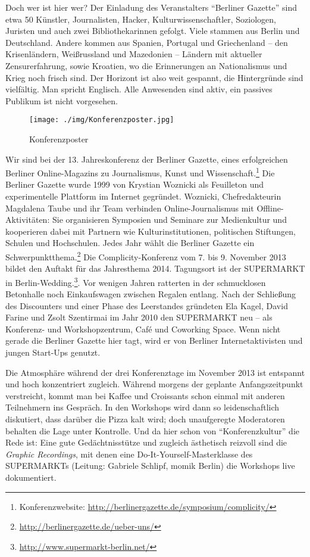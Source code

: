 \documentclass[a4paper,
fontsize=11pt,
oneside,
numbers=noperiodatend,
parskip=half-,
bibliography=totoc,
final
]{scrartcl}
\begin{document}
Doch wer ist hier wer? Der Einladung des Veranstalters \enquote{Berliner
Gazette} sind etwa 50 Künstler, Journalisten, Hacker,
Kulturwissenschaftler, Soziologen, Juristen und auch zwei
Bibliothekarinnen gefolgt. Viele stammen aus Berlin und Deutschland.
Andere kommen aus Spanien, Portugal und Griechenland -- den
Krisenländern, Weißrussland und Mazedonien -- Ländern mit aktueller
Zensurerfahrung, sowie Kroatien, wo die Erinnerungen an Nationalismus
und Krieg noch frisch sind. Der Horizont ist also weit gespannt, die
Hintergründe sind vielfältig. Man spricht Englisch. Alle Anwesenden sind
aktiv, ein passives Publikum ist nicht vorgesehen.

\begin{figure}[htbp]
\centering
\texttt{[image: ./img/Konferenzposter.jpg]}
\caption{Konferenzposter}
\end{figure}

Wir sind bei der 13. Jahreskonferenz der Berliner Gazette, eines
erfolgreichen Berliner Online-Magazins zu Journalismus, Kunst und
Wissenschaft.\footnote{Konferenzwebsite:
  \url{http://berlinergazette.de/symposium/complicity/}} Die Berliner
Gazette wurde 1999 von Krystian Woznicki als Feuilleton und
experimentelle Plattform im Internet gegründet. Woznicki,
Chefredakteurin Magdalena Taube und ihr Team verbinden
Online-Journalismus mit Offline-Aktivitäten: Sie organisieren Symposien
und Seminare zur Medienkultur und kooperieren dabei mit Partnern wie
Kulturinstitutionen, politischen Stiftungen, Schulen und Hochschulen.
Jedes Jahr wählt die Berliner Gazette ein Schwerpunktthema.\footnote{\url{http://berlinergazette.de/ueber-uns/}}
Die Complicity-Konferenz vom 7. bis 9. November 2013 bildet den Auftakt
für das Jahresthema 2014. Tagungsort ist der SUPERMARKT in
Berlin-Wedding.\footnote{\url{http://www.supermarkt-berlin.net/}}. Vor
wenigen Jahren ratterten in der schmucklosen Betonhalle noch
Einkaufswagen zwischen Regalen entlang. Nach der Schließung des
Discounters und einer Phase des Leerstandes gründeten Ela Kagel, David
Farine und Zsolt Szentirmai im Jahr 2010 den SUPERMARKT neu -- als
Konferenz- und Workshopzentrum, Café und Coworking Space. Wenn nicht
gerade die Berliner Gazette hier tagt, wird er von Berliner
Internetaktivisten und jungen Start-Ups genutzt.

Die Atmosphäre während der drei Konferenztage im November 2013 ist
entspannt und hoch konzentriert zugleich. Während morgens der geplante
Anfangszeitpunkt verstreicht, kommt man bei Kaffee und Croissants schon
einmal mit anderen Teilnehmern ins Gespräch. In den Workshops wird dann
so leidenschaftlich diskutiert, dass darüber die Pizza kalt wird; doch
unaufgeregte Moderatoren behalten die Lage unter Kontrolle. Und da hier
schon von \enquote{Konferenzkultur} die Rede ist: Eine gute
Gedächtnisstütze und zugleich ästhetisch reizvoll sind die \emph{Graphic
Recordings}, mit denen eine Do-It-Yourself-Masterklasse des SUPERMARKTs
(Leitung: Gabriele Schlipf, momik Berlin) die Workshops live
dokumentiert.
\end{document}
